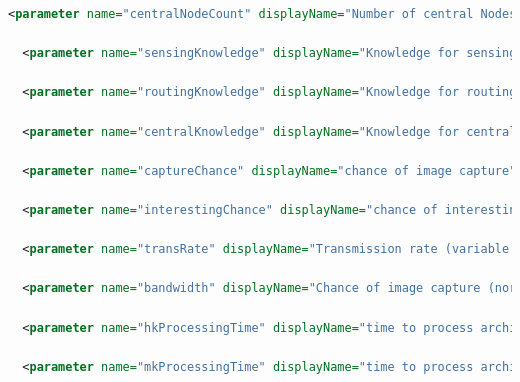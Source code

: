 \begin{appendices}
\begin{lstlisting}[language=XML, caption={Example params.xml file for a Repast simulation}]
  <parameter name="centralNodeCount" displayName="Number of central Nodes" type="int" defaultValue="1" isReadOnly="false" converter="repast.simphony.parameter.StringConverterFactory$IntConverter" />
  
  <parameter name="sensingKnowledge" displayName="Knowledge for sensing nodes" type="java.lang.String" defaultValue="MK" isReadOnly="false" converter="repast.simphony.parameter.StringConverterFactory$StringStringConverter"/>

  <parameter name="routingKnowledge" displayName="Knowledge for routing nodes" type="java.lang.String" defaultValue="MK" isReadOnly="false" converter="repast.simphony.parameter.StringConverterFactory$StringStringConverter"/>
  
  <parameter name="centralKnowledge" displayName="Knowledge for central nodes" type="java.lang.String" defaultValue="NK" isReadOnly="false" converter="repast.simphony.parameter.StringConverterFactory$StringStringConverter"/>
  
  <parameter name="captureChance" displayName="chance of image capture" type="double" defaultValue="0.000857703189" isReadOnly="false" converter="repast.simphony.parameter.StringConverterFactory$DoubleConverter"/>
  
  <parameter name="interestingChance" displayName="chance of interesting capture" type="double" defaultValue="0.207" isReadOnly="false" converter="repast.simphony.parameter.StringConverterFactory$DoubleConverter"/>
  
  <parameter name="transRate" displayName="Transmission rate (variable or ideal)" type="java.lang.String" defaultValue="variable" isReadOnly="false" converter="repast.simphony.parameter.StringConverterFactory$StringStringConverter" />
  
  <parameter name="bandwidth" displayName="Chance of image capture (normal or saturated)" type="java.lang.String" defaultValue="normal" isReadOnly="false" converter="repast.simphony.parameter.StringConverterFactory$StringStringConverter" />
  
  <parameter name="hkProcessingTime" displayName="time to process archive" type="int" defaultValue="43" isReadOnly="false" converter="repast.simphony.parameter.StringConverterFactory$IntConverter"/>
  
  <parameter name="mkProcessingTime" displayName="time to process archive" type="int" defaultValue="5" isReadOnly="false" converter="repast.simphony.parameter.StringConverterFactory$IntConverter"/>
  

\end{lstlisting}
\end{appendices}
